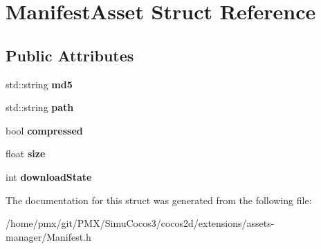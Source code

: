 \hypertarget{structManifestAsset}{}\section{Manifest\+Asset Struct Reference}
\label{structManifestAsset}
\subsection*{Public Attributes}
\begin{DoxyCompactItemize}
\item 
\mbox{\label{structManifestAsset_adbb428376f80008844ad2270d03a9953}} 
std\+::string {\bfseries md5}
\item 
\mbox{\label{structManifestAsset_a4ad111b23d4ac2315b1c670694a36a66}} 
std\+::string {\bfseries path}
\item 
\mbox{\label{structManifestAsset_a97ec41c033efe7a37b2f235450502d1c}} 
bool {\bfseries compressed}
\item 
\mbox{\label{structManifestAsset_a9c6fb1bc331fceb69533a8d756c182b2}} 
float {\bfseries size}
\item 
\mbox{\label{structManifestAsset_a01363a45721260161c158749ca8aa0d4}} 
int {\bfseries download\+State}
\end{DoxyCompactItemize}


The documentation for this struct was generated from the following file\+:\begin{DoxyCompactItemize}
\item 
/home/pmx/git/\+P\+M\+X/\+Simu\+Cocos3/cocos2d/extensions/assets-\/manager/Manifest.\+h\end{DoxyCompactItemize}
